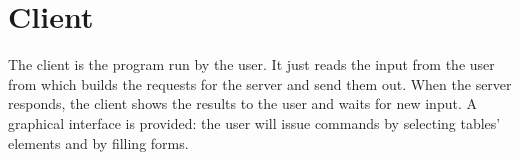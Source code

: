 \section{Client}\label{sec:client}

The client is the program run by the user. It just reads the input from the user
from which builds the requests for the server and send them out. When the server
responds, the client shows the results to the user and waits for new input. A
graphical interface is provided: the user will issue commands by selecting
tables' elements and by filling forms.
